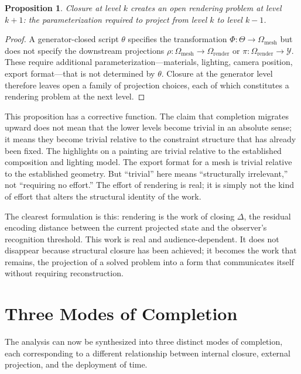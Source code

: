 \documentclass[12pt, twoside]{article}
\theoremstyle{plain}
\newtheorem{proposition}[theorem]{Proposition}
\theoremstyle{definition}
\theoremstyle{remark}
\begin{document}
\begin{proposition}
\label{prop:relocation}
Closure at level $k$ creates an open rendering problem at level $k+1$: the parameterization required to project from level $k$ to level $k-1$.
\end{proposition}

\begin{proof}
A generator-closed script $\theta$ specifies the transformation $\Phi : \Theta \to \Omega_{\text{mesh}}$ but does not specify the downstream projections $\rho : \Omega_{\text{mesh}} \to \Omega_{\text{render}}$ or $\pi : \Omega_{\text{render}} \to \mathcal{Y}$. These require additional parameterization---materials, lighting, camera position, export format---that is not determined by $\theta$. Closure at the generator level therefore leaves open a family of projection choices, each of which constitutes a rendering problem at the next level.
\end{proof}

This proposition has a corrective function. The claim that completion migrates upward does not mean that the lower levels become trivial in an absolute sense; it means they become trivial relative to the constraint structure that has already been fixed. The highlights on a painting are trivial relative to the established composition and lighting model. The export format for a mesh is trivial relative to the established geometry. But ``trivial'' here means ``structurally irrelevant,'' not ``requiring no effort.'' The effort of rendering is real; it is simply not the kind of effort that alters the structural identity of the work.

The clearest formulation is this: rendering is the work of closing $\Delta$, the residual encoding distance between the current projected state and the observer's recognition threshold. This work is real and audience-dependent. It does not disappear because structural closure has been achieved; it becomes the work that remains, the projection of a solved problem into a form that communicates itself without requiring reconstruction.

\section{Three Modes of Completion}
\label{sec:three-modes}

The analysis can now be synthesized into three distinct modes of completion, each corresponding to a different relationship between internal closure, external projection, and the deployment of time.
\end{document}
